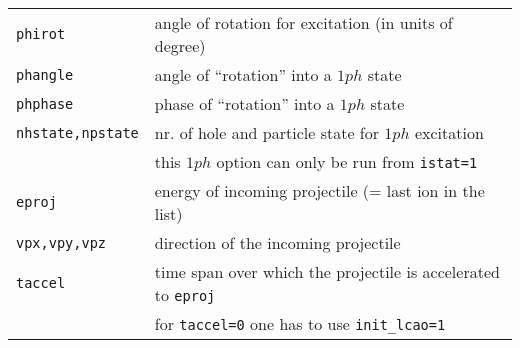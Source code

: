 \documentclass[12pt]{article}
\begin{document}
\begin{tabular}{ll}
{\tt phirot} & angle of rotation for excitation (in units of degree)\\
{\tt phangle}        & angle of ``rotation'' into a $1ph$ state\\
{\tt phphase}        & phase of ``rotation'' into a $1ph$ state\\
{\tt nhstate,npstate}& nr. of hole and particle state for $1ph$
                      excitation\\
                     & this $1ph$ option can only be run from {\tt istat=1}
\\
{\tt eproj}& energy of incoming projectile (= last ion in the list)
\\
{\tt vpx,vpy,vpz}& direction of the incoming projectile
\\
{\tt taccel}& time span over which the projectile is accelerated to
             {\tt eproj}
\\
& for {\tt taccel=0} one has to use {\tt init\_lcao=1}
\\
\hline
\end{tabular}
\end{document}
